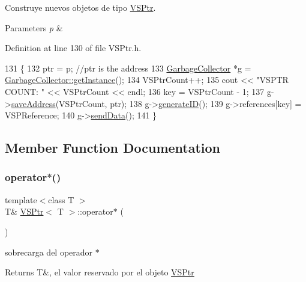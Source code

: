 Construye nuevos objetos de tipo \hyperlink{classVSPtr}{V\+S\+Ptr}. 


\begin{DoxyParams}{Parameters}
{\em p} & \\
\hline
\end{DoxyParams}


Definition at line 130 of file V\+S\+Ptr.\+h.


\begin{DoxyCode}
131     \{
132         ptr = p; \textcolor{comment}{//ptr is the address}
133         \hyperlink{classGarbageCollector}{GarbageCollector} *g = \hyperlink{classGarbageCollector_ade4bccdf41223cc395b646db3f60ac8b}{GarbageCollector::getInstance}();
134         VSPtrCount++;
135         cout << \textcolor{stringliteral}{"VSPTR COUNT: "} << VSPtrCount << endl;
136         key = VSPtrCount - 1;
137         g->\hyperlink{classGarbageCollector_aabb68414b8f72ca07aeb13ff7cc1d060}{saveAddress}(VSPtrCount, ptr);
138         g->\hyperlink{classGarbageCollector_a22601db30594acef6fbea411f49f3fde}{generateID}();
139         g->references[key] = VSPReference;
140         g->\hyperlink{classGarbageCollector_ac66057f60dcabda9c78f88de90863729}{sendData}();
141     \}
\end{DoxyCode}


\subsection{Member Function Documentation}
\mbox{\label{classVSPtr_a77ecd1f1e117ff07a181c265aac5c8e3}} 
\subsubsection{\texorpdfstring{operator$\ast$()}{operator*()}}
{\footnotesize\ttfamily template$<$class T $>$ \\
T\& \hyperlink{classVSPtr}{V\+S\+Ptr}$<$ T $>$\+::operator$\ast$ (\begin{DoxyParamCaption}{ }\end{DoxyParamCaption})\hspace{0.3cm}{\ttfamily [inline]}}



sobrecarga del operador $\ast$ 

\begin{DoxyReturn}{Returns}
T\&, el valor reservado por el objeto \hyperlink{classVSPtr}{V\+S\+Ptr} 
\end{DoxyReturn}


